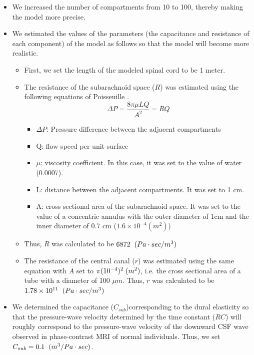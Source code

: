 \documentclass[fleqn,10pt]{wlscirep}
\begin{document}
\begin{itemize}
    \item We increased the number of compartments from 10 to 100, thereby making the model more precise.
    \item We estimated the values of the parameters (the capacitance and resistance of each component) of the model as follows so that the model will become more realistic.
        \begin{itemize}
            \item First, we set the length of the modeled spinal cord to be 1 meter.
            \item The resistance of the subarachnoid space ($R$) was
                estimated using the following equations of Poisseuille
                \cite{brook1999numerical, sherwin2003computational, huilgol2020fast}. 
             $$\Delta P=\frac{8\pi \mu{}LQ}{A^{2}}=RQ$$
                \begin{itemize}
                    \item $\Delta P$: Pressure difference between the adjacent compartments
                    \item Q: flow speed per unit surface
                    \item $\mu$: viscosity coefficient. In this case, it was set to the value of water (0.0007).
                    \item L: distance between the adjacent compartments. It was set to 1 cm.
                    \item A: cross sectional area of the subarachnoid
                        space. It was set to the value of a concentric
                        annulus \cite{huilgol2020fast} with the outer diameter of 1cm and the inner diameter of 0.7 cm ($1.6\times{}10^{-4} (m^2)$) 
                \end{itemize}
            \item Thus, $R$ was calculated to be $6872\hspace{0.2cm}(Pa\cdot{}sec/m^3)$
            \item The resistance of the central canal ($r$) was estimated
                using the same equation with $A$ set to
                $\pi{}(10^{-4})^2\hspace{0.1cm}(m^2)$, i.e. the cross
                sectional area of a tube with a diameter of 100 $\mu{}m$.
                Thus, $r$ was calculated to be $1.78\times10^{11}\hspace{0.2cm}(Pa\cdot{}sec/m^3)$
        \end{itemize}
    \item We determined the capacitance ($C_{sub}$)corresponding to the dural elasticity so that the pressure-wave velocity determined by the time constant ($RC$) will roughly correspond to the pressure-wave velocity of the downward CSF wave observed in phase-contrast MRI of normal individuals. Thus, we set $C_{sub}=0.1\hspace{0.2cm}(m^3/Pa\cdot{}sec)$.
\end{itemize}
\end{document}
